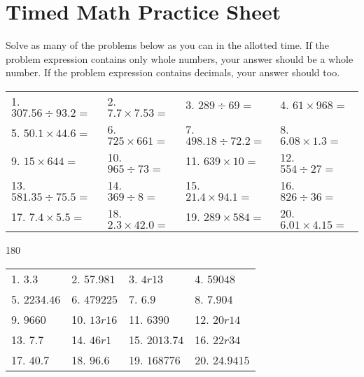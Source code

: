 \documentclass{article}
\begin{document}
\thispagestyle{148984799266}
\section*{Timed Math Practice Sheet}
Solve as many of the problems below as you can in the allotted time. If the problem expression contains only whole numbers, your answer should be a whole number. If the problem expression contains decimals, your answer should too.\bigskip\bigskip\\
\begin{tabular}{ m{4cm} m{4cm} m{4cm} m{4cm} }
1. $307.56 \div 93.2 =$
 & 
2. $7.7 \times 7.53 =$
 & 
3. $289 \div 69 =$
 & 
4. $61 \times 968 =$
 \\[3.5cm]
5. $50.1 \times 44.6 =$
 & 
6. $725 \times 661 =$
 & 
7. $498.18 \div 72.2 =$
 & 
8. $6.08 \times 1.3 =$
 \\[3.5cm]
9. $15 \times 644 =$
 & 
10. $965 \div 73 =$
 & 
11. $639 \times 10 =$
 & 
12. $554 \div 27 =$
 \\[3.5cm]
13. $581.35 \div 75.5 =$
 & 
14. $369 \div 8 =$
 & 
15. $21.4 \times 94.1 =$
 & 
16. $826 \div 36 =$
 \\[3.5cm]
17. $7.4 \times 5.5 =$
 & 
18. $2.3 \times 42.0 =$
 & 
19. $289 \times 584 =$
 & 
20. $6.01 \times 4.15 =$
 \\[3.5cm]
\end{tabular}
\newpage
\vspace*{\fill}
\begin{flushright}
\begin{turn}{180}
\begin{tabular}{ m{4cm} m{4cm} m{4cm} m{4cm} }
1. $3.3$
 & 
2. $57.981$
 & 
3. $4r13$
 & 
4. $59048$
 \\[10pt]
5. $2234.46$
 & 
6. $479225$
 & 
7. $6.9$
 & 
8. $7.904$
 \\[10pt]
9. $9660$
 & 
10. $13r16$
 & 
11. $6390$
 & 
12. $20r14$
 \\[10pt]
13. $7.7$
 & 
14. $46r1$
 & 
15. $2013.74$
 & 
16. $22r34$
 \\[10pt]
17. $40.7$
 & 
18. $96.6$
 & 
19. $168776$
 & 
20. $24.9415$
 \\[10pt]
\end{tabular}
\end{turn}
\end{flushright}
\end{document}

